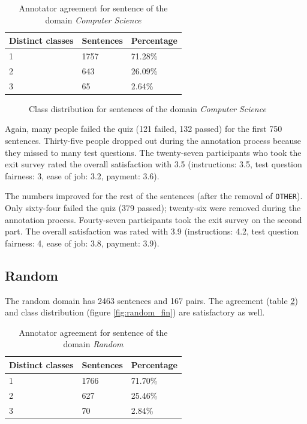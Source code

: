 \begin{table}[h]
\caption{Annotator agreement for sentence of the domain \emph{Computer Science}}
\label{fig:compsci_agg}
\begin{tabularx}{\textwidth}{XXX}
\toprule
Distinct classes & Sentences & Percentage \\
\midrule
1 & 1757 & 71.28\%\\
2 & 643 & 26.09\%\\
3 & 65 & 2.64\%\\
\bottomrule
\end{tabularx}
\end{table}


\begin{figure}[h]
\centering
\caption{Class distribution for sentences of the domain \emph{Computer Science}}
\label{fig:compsci_fin}
\end{figure}

Again, many people failed the quiz (121 failed, 132 passed) for the first 750 sentences. Thirty-five people dropped out during the annotation process because they missed to many test questions. The twenty-seven participants who took the exit survey rated the overall satisfaction with 3.5 (instructions: 3.5, test question fairness: 3, ease of job: 3.2, payment: 3.6).

The numbers improved for the rest of the sentences (after the removal of \texttt{OTHER}). Only sixty-four failed the quiz (379 passed); twenty-six were removed during the annotation process. Fourty-seven participants took the exit survey on the second part. The overall satisfaction was rated with 3.9 (instructions: 4.2, test question fairness: 4, ease of job: 3.8, payment: 3.9).

\subsection{Random}
The random domain has 2463 sentences and 167 pairs. The agreement (table \ref{fig:random_agg}) and class distribution (figure \ref{fig:random_fin}) are satisfactory as well.
    
\begin{table}[h]
\caption{Annotator agreement for sentence of the domain \emph{Random}}
\label{fig:random_agg}
\begin{tabularx}{\textwidth}{XXX}
\toprule
Distinct classes & Sentences & Percentage \\
\midrule
1 & 1766 & 71.70\%\\
2 & 627 & 25.46\%\\
3 & 70 & 2.84\%\\
\bottomrule
\end{tabularx}
\end{table}


